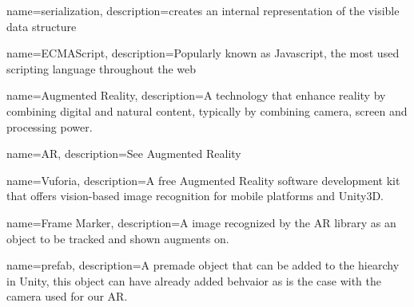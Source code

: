{
	name=serialization,
	description={creates an internal representation of the visible data 
  				structure}
}

{
	name=ECMAScript,
	description={Popularly known as Javascript, the most used scripting
				language throughout the web}
}

{
	name=Augmented Reality,
	description={A technology that enhance reality by combining digital and
				natural content, typically by combining camera, screen and
				processing power.}
}

{
	name=AR,
	description={See \gls{Augmented Reality}}
}

{
	name=Vuforia,
	description={A free Augmented Reality software development kit that	offers
				vision-based image recognition for mobile platforms	and 
				Unity3D.}
}

{
	name=Frame Marker,
	description={A image recognized by the AR library as an object to be tracked and shown augments on.}
}

{
	name=prefab,
	description={A premade object that can be added to the hiearchy in Unity, this object can have already added behvaior as is the case with the camera used for our \gls{AR}.}
}
